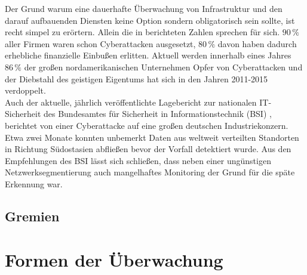 Der Grund warum eine dauerhafte Überwachung von Infrastruktur und den darauf aufbauenden 
Diensten keine Option sondern obligatorisch sein sollte, ist recht simpel zu erörtern. 
Allein die in \cite[461]{francia} berichteten Zahlen sprechen für sich. $90\,\%$ aller 
Firmen waren schon Cyberattacken ausgesetzt, $80\,\%$ davon haben dadurch erhebliche 
finanzielle Einbußen erlitten. Aktuell werden innerhalb eines Jahres $86\,\%$ der großen 
nordamerikanischen Unternehmen Opfer von Cyberattacken und der Diebstahl des geistigen 
Eigentums hat sich in den Jahren 2011-2015 verdoppelt.\\
Auch der aktuelle, jährlich veröffentlichte Lagebericht zur nationalen IT-Sicherheit des
Bundesamtes für Sicherheit in Informationstechnik (BSI) \cite[12]{bsi-lage}, berichtet  
von einer Cyberattacke auf eine großen deutschen Industriekonzern. Etwa zwei Monate 
konnten unbemerkt Daten aus weltweit verteilten Standorten in Richtung Südostasien 
abfließen bevor der Vorfall detektiert wurde. Aus den Empfehlungen des BSI lässt sich 
schließen, dass neben einer ungünstigen Netzwerksegmentierung auch mangelhaftes Monitoring
der Grund für die späte Erkennung war. 


\subsection{Gremien}

\section{Formen der Überwachung}